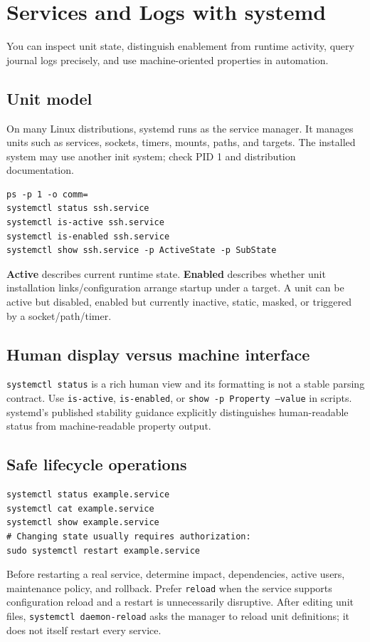 \documentclass[11pt,oneside,openany]{book}
\newcommand{\term}[1]{\textbf{\color{Navy}#1}}
\newcommand{\chaptergoals}[1]{%
  \begin{tcolorbox}[colback=Paper,colframe=Blue,title={Learning outcomes},fonttitle=\bfseries]
  #1
  \end{tcolorbox}}
\begin{document}
\chapter{Services and Logs with systemd}
\chaptergoals{You can inspect unit state, distinguish enablement from runtime activity, query journal logs precisely, and use machine-oriented properties in automation.}

\section{Unit model}
On many Linux distributions, systemd runs as the service manager. It manages units such as services, sockets, timers, mounts, paths, and targets. The installed system may use another init system; check PID 1 and distribution documentation.

\begin{lstlisting}
ps -p 1 -o comm=
systemctl status ssh.service
systemctl is-active ssh.service
systemctl is-enabled ssh.service
systemctl show ssh.service -p ActiveState -p SubState
\end{lstlisting}
\term{Active} describes current runtime state. \term{Enabled} describes whether unit installation links/configuration arrange startup under a target. A unit can be active but disabled, enabled but currently inactive, static, masked, or triggered by a socket/path/timer.

\section{Human display versus machine interface}
\texttt{systemctl status} is a rich human view and its formatting is not a stable parsing contract. Use \texttt{is-active}, \texttt{is-enabled}, or \texttt{show -p Property --value} in scripts. systemd's published stability guidance explicitly distinguishes human-readable status from machine-readable property output.

\section{Safe lifecycle operations}
\begin{lstlisting}
systemctl status example.service
systemctl cat example.service
systemctl show example.service
# Changing state usually requires authorization:
sudo systemctl restart example.service
\end{lstlisting}
Before restarting a real service, determine impact, dependencies, active users, maintenance policy, and rollback. Prefer \texttt{reload} when the service supports configuration reload and a restart is unnecessarily disruptive. After editing unit files, \texttt{systemctl daemon-reload} asks the manager to reload unit definitions; it does not itself restart every service.
\end{document}
